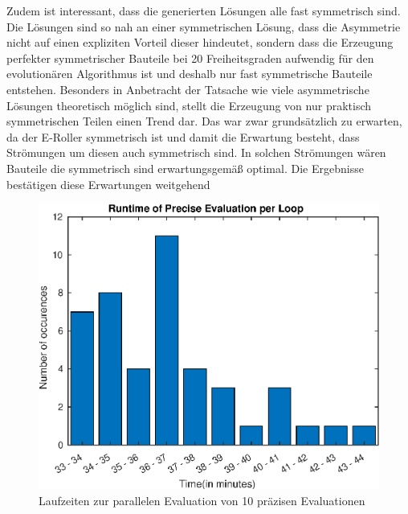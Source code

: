 Zudem ist interessant, dass die generierten Lösungen alle fast symmetrisch sind.
Die Lösungen sind so nah an einer symmetrischen Lösung, dass die Asymmetrie nicht auf einen expliziten Vorteil dieser hindeutet, sondern dass die Erzeugung perfekter symmetrischer Bauteile bei 20 Freiheitsgraden aufwendig für den evolutionären Algorithmus ist und deshalb nur fast symmetrische Bauteile entstehen.
Besonders in Anbetracht der Tatsache wie viele asymmetrische Lösungen theoretisch möglich sind, stellt die Erzeugung von nur praktisch symmetrischen Teilen einen Trend dar.
Das war zwar grundsätzlich zu erwarten, da der E-Roller symmetrisch ist und damit die Erwartung besteht, dass Strömungen um diesen auch symmetrisch sind.
In solchen Strömungen wären Bauteile die symmetrisch sind erwartungsgemäß optimal. 
Die Ergebnisse bestätigen diese Erwartungen weitgehend

\begin{figure}[h]
	\centering
	\includegraphics[width=.7\linewidth]{bilder/escooter/peRuntime}
	\caption{Laufzeiten zur parallelen Evaluation von 10 präzisen Evaluationen}
	\label{fig:escooterpeRuntime}
\end{figure}


